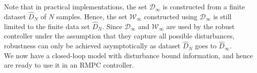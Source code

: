 \documentclass[letterpaper, 10 pt, conference]{ieeeconf}  %
\begin{document}
	\vspace{0.001cm}\\
	 \\
	  Note that in practical implementations, the set $\mathcal{D}_{\infty}$ is constructed from a finite dataset $\hat{D}_{N}$ of $N$ samples. Hence, the set $\mathcal{W}_{\infty}$ constructed using $\mathcal{D}_{\infty}$ is still limited to the finite data set $\hat{D}_{N}$. Since $\mathcal{D}_{\infty}$ and $\mathcal{W}_{\infty}$ are used by the robust controller under the assumption that they capture all possible disturbances, robustness can only be achieved asymptotically as dataset $\hat{D}_{N}$ goes to $\hat{D}_{\infty}$. \\
	We now have a closed-loop model with disturbance bound information, and hence are ready to use it in an RMPC controller.
\end{document}
